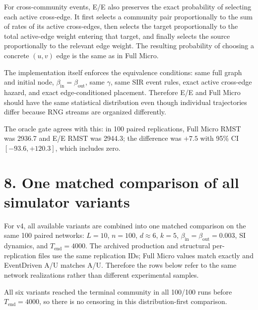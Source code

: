 \documentclass[11pt,a4paper]{article}
\begin{document}
For cross-community events, E/E also preserves the exact probability of selecting each active cross-edge. It first selects a community pair proportionally to the sum of rates of its active cross-edges, then selects the target proportionally to the total active-edge weight entering that target, and finally selects the source proportionally to the relevant edge weight. The resulting probability of choosing a concrete $(u,v)$ edge is the same as in Full Micro.

\begin{tcolorbox}[colback=soft,colframe=exact,title=No ``if the rules match'' qualifier is needed for Experiment 01]
The implementation itself enforces the equivalence conditions: same full graph and initial node, $\beta_{\mathrm{in}}=\beta_{\mathrm{out}}$, same $\gamma$, same SIR event rules, exact active cross-edge hazard, and exact edge-conditioned placement. Therefore E/E and Full Micro should have the same statistical distribution even though individual trajectories differ because RNG streams are organized differently.
\end{tcolorbox}

The oracle gate agrees with this: in 100 paired replications, Full Micro RMST was 2936.7 and E/E RMST was 2944.3; the difference was $+7.5$ with 95\% CI $[-93.6,+120.3]$, which includes zero.

\section*{8. One matched comparison of all simulator variants}
For v4, all available variants are combined into one matched comparison on the same 100 paired networks: $L=10$, $n=100$, $d\approx6$, $k=5$, $\beta_{\mathrm{in}}=\beta_{\mathrm{out}}=0.003$, SI dynamics, and $T_{\mathrm{end}}=4000$. The archived production and structural per-replication files use the same replication IDs; Full Micro values match exactly and EventDriven A/U matches A/U. Therefore the rows below refer to the same network realizations rather than different experimental samples.

All six variants reached the terminal community in all 100/100 runs before $T_{\mathrm{end}}=4000$, so there is no censoring in this distribution-first comparison.
\end{document}
